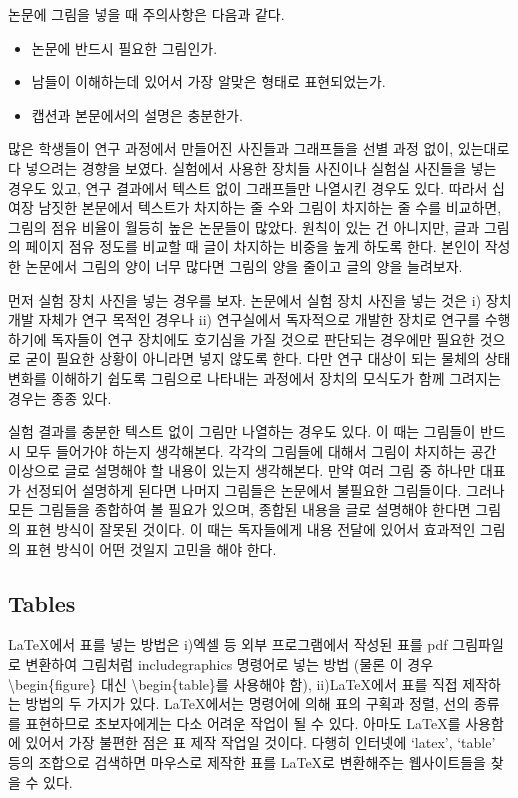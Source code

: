 \documentclass{gshs-report-v1.2}
\begin{document}
논문에 그림을 넣을 때 주의사항은 다음과 같다.
\begin{itemize}
	\item{논문에 반드시 필요한 그림인가.}
	\item{남들이 이해하는데 있어서 가장 알맞은 형태로 표현되었는가.}
	\item{캡션과 본문에서의 설명은 충분한가.}
\end{itemize}
많은 학생들이 연구 과정에서 만들어진 사진들과 그래프들을 선별 과정 없이, 있는대로 다 넣으려는 경향을 보였다. 실험에서 사용한 장치들 사진이나 실험실 사진들을 넣는 경우도 있고, 연구 결과에서 텍스트 없이 그래프들만 나열시킨 경우도 있다. 따라서 십여장 남짓한 본문에서 텍스트가 차지하는 줄 수와 그림이 차지하는 줄 수를 비교하면, 그림의 점유 비율이 월등히 높은 논문들이 많았다. 원칙이 있는 건 아니지만, 글과 그림의 페이지 점유 정도를 비교할 때 글이 차지하는 비중을 높게 하도록 한다. 본인이 작성한 논문에서 그림의 양이 너무 많다면 그림의 양을 줄이고 글의 양을 늘려보자.

먼저 실험 장치 사진을 넣는 경우를 보자. 논문에서 실험 장치 사진을 넣는 것은 i) 장치 개발 자체가 연구 목적인 경우나 ii) 연구실에서 독자적으로 개발한 장치로 연구를 수행하기에 독자들이 연구 장치에도 호기심을 가질 것으로 판단되는 경우에만 필요한 것으로 굳이 필요한 상황이 아니라면 넣지 않도록 한다. 다만 연구 대상이 되는 물체의 상태 변화를 이해하기 쉽도록 그림으로 나타내는 과정에서 장치의 모식도가 함께 그려지는 경우는 종종 있다.

실험 결과를 충분한 텍스트 없이 그림만 나열하는 경우도 있다. 이 때는 그림들이 반드시 모두 들어가야 하는지 생각해본다. 각각의 그림들에 대해서 그림이 차지하는 공간 이상으로 글로 설명해야 할 내용이 있는지 생각해본다. 만약 여러 그림 중 하나만 대표가 선정되어 설명하게 된다면 나머지 그림들은 논문에서 불필요한 그림들이다. 그러나 모든 그림들을 종합하여 볼 필요가 있으며, 종합된 내용을 글로 설명해야 한다면 그림의 표현 방식이 잘못된 것이다. 이 때는 독자들에게 내용 전달에 있어서 효과적인 그림의 표현 방식이 어떤 것일지 고민을 해야 한다.

\subsection{Tables}

\LaTeX 에서 표를 넣는 방법은 i)엑셀 등 외부 프로그램에서 작성된 표를 pdf 그림파일로 변환하여 그림처럼 includegraphics 명령어로 넣는 방법 (물론 이 경우 {\textbackslash}begin\{figure\} 대신 {\textbackslash}begin\{table\}를 사용해야 함), ii)\LaTeX 에서 표를 직접 제작하는 방법의 두 가지가 있다. \LaTeX 에서는 명령어에 의해 표의 구획과 정렬, 선의 종류를 표현하므로 초보자에게는 다소 어려운 작업이 될 수 있다. 아마도 \LaTeX 를 사용함에 있어서 가장 불편한 점은 표 제작 작업일 것이다. 다행히 인터넷에 `latex', `table' 등의 조합으로 검색하면 마우스로 제작한 표를 \LaTeX 로 변환해주는 웹사이트들을 찾을 수 있다.
\end{document}
